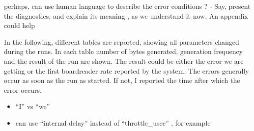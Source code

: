 \documentclass[12pt]{article}
\newcommand {\add}[1]    {{\red #1}}
\newcommand {\red}       {\color{red}}
\begin{document}
\add{
  perhaps, can use human language to describe the error conditions ? - Say, present the diagnostics,
  and explain its meaning , as we understand it now. An appendix could help\\
}

In the following, different tables are reported, showing all parameters changed during the runs. In each table number of bytes generated, generation frequency and the result of the run are shown. The result could be either the error we are getting or the first boardreader rate reported by the system. The errors generally occur as soon as the run as started. If not, I reported the time after which the error occurs.

\add{
  \begin{itemize}
  \item 
    ``I'' vs ``we''
  \item
    can use ``internal delay'' instead of ``throttle\_usec'' , for example
  \end{itemize}
}
\end{document}
